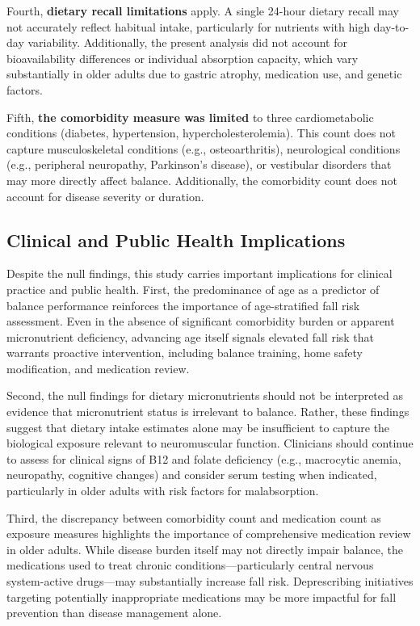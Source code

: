\documentclass[11pt,a4paper]{article}
\begin{document}
Fourth, \textbf{dietary recall limitations} apply. A single 24-hour dietary recall may not accurately reflect habitual intake, particularly for nutrients with high day-to-day variability. Additionally, the present analysis did not account for bioavailability differences or individual absorption capacity, which vary substantially in older adults due to gastric atrophy, medication use, and genetic factors.

Fifth, \textbf{the comorbidity measure was limited} to three cardiometabolic conditions (diabetes, hypertension, hypercholesterolemia). This count does not capture musculoskeletal conditions (e.g., osteoarthritis), neurological conditions (e.g., peripheral neuropathy, Parkinson's disease), or vestibular disorders that may more directly affect balance. Additionally, the comorbidity count does not account for disease severity or duration.

\subsection{Clinical and Public Health Implications}

Despite the null findings, this study carries important implications for clinical practice and public health. First, the predominance of age as a predictor of balance performance reinforces the importance of age-stratified fall risk assessment. Even in the absence of significant comorbidity burden or apparent micronutrient deficiency, advancing age itself signals elevated fall risk that warrants proactive intervention, including balance training, home safety modification, and medication review.

Second, the null findings for dietary micronutrients should not be interpreted as evidence that micronutrient status is irrelevant to balance. Rather, these findings suggest that dietary intake estimates alone may be insufficient to capture the biological exposure relevant to neuromuscular function. Clinicians should continue to assess for clinical signs of B12 and folate deficiency (e.g., macrocytic anemia, neuropathy, cognitive changes) and consider serum testing when indicated, particularly in older adults with risk factors for malabsorption.

Third, the discrepancy between comorbidity count and medication count as exposure measures highlights the importance of comprehensive medication review in older adults. While disease burden itself may not directly impair balance, the medications used to treat chronic conditions—particularly central nervous system-active drugs—may substantially increase fall risk. Deprescribing initiatives targeting potentially inappropriate medications may be more impactful for fall prevention than disease management alone.
\end{document}
